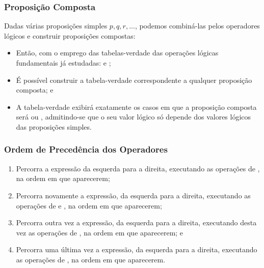 \documentclass[aspectratio=169]{beamer} %
\begin{document}
\begin{frame}
\frametitle{Proposição Composta}

Dadas várias proposições simples $p, q,r, . . .$, podemos combiná-las pelos operadores lógicos \structure{$\wedge, \vee, \rightarrow, \leftrightarrow$} e construir proposições compostas:\vfill

\begin{itemize}
	\item Então, com o emprego das tabelas-verdade das operações lógicas fundamentais já estudadas:  e ;
	\item É possível construir a tabela-verdade correspondente a qualquer proposição composta; e
	\item A tabela-verdade exibirá exatamente os casos em que a proposição composta será  ou , admitindo-se que o seu valor lógico só depende dos valores lógicos das proposições simples.
\end{itemize}
\end{frame}

\begin{frame}
\frametitle{Ordem de Precedência dos Operadores}

\begin{enumerate}
	\item Percorra a expressão da esquerda para a direita, executando as operações de , na ordem em que aparecerem;
	\item Percorra novamente a expressão, da esquerda para a direita, executando as operações de  e , na ordem em que aparecerem;
	\item Percorra outra vez a expressão, da esquerda para a direita, executando desta vez as operações de , na ordem em que aparecerem; e
	\item Percorra uma última vez a expressão, da esquerda para a direita, executando as operações de , na ordem em que aparecerem.
\end{enumerate}
\end{frame}
\end{document}
